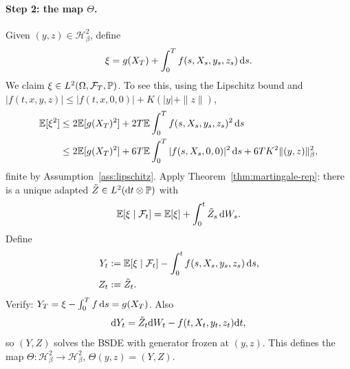 \paragraph{Step 2: the map $\Theta$.}  Given $(y, z) \in \mathcal{H}^2_\beta$, define
\begin{equation}
  \xi = g(X_T) + \int_0^T f(s, X_s, y_s, z_s) \, \mathrm{d} s.
\end{equation}
We claim $\xi \in L^2(\Omega, \mathcal{F}_T, \mathbb{P})$. To see this, using the Lipschitz bound and $|f(t, x, y, z)| \leq |f(t, x, 0, 0)| + K(|y| + \|z\|)$,
\begin{align*}
  \mathbb{E}[\xi^2] &\leq 2 \mathbb{E}[g(X_T)^2] + 2 T \mathbb{E}\int_0^T f(s, X_s, y_s, z_s)^2 \, \mathrm{d} s \\
  &\leq 2 \mathbb{E}[g(X_T)^2] + 6 T \mathbb{E}\int_0^T |f(s, X_s, 0, 0)|^2 \, \mathrm{d} s + 6 T K^2 \|(y, z)\|_\beta^2,
\end{align*}
finite by Assumption~\ref{ass:lipschitz}. Apply Theorem~\ref{thm:martingale-rep}: there is a unique adapted $\tilde Z \in L^2(\mathrm{d} t \otimes \mathbb{P})$ with
\begin{equation}
  \mathbb{E}[\xi \mid \mathcal{F}_t] = \mathbb{E}[\xi] + \int_0^t \tilde Z_s \, \mathrm{d} W_s.
\end{equation}
Define
\begin{align}
  Y_t &:= \mathbb{E}[\xi \mid \mathcal{F}_t] - \int_0^t f(s, X_s, y_s, z_s) \, \mathrm{d} s, \\
  Z_t &:= \tilde Z_t.
\end{align}
Verify: $Y_T = \xi - \int_0^T f \, \mathrm{d} s = g(X_T)$. Also
\begin{equation}
  \mathrm{d} Y_t = \tilde Z_t \mathrm{d} W_t - f(t, X_t, y_t, z_t) \mathrm{d} t,
\end{equation}
so $(Y, Z)$ solves the BSDE with generator frozen at $(y, z)$. This defines the map $\Theta : \mathcal{H}^2_\beta \to \mathcal{H}^2_\beta$, $\Theta(y, z) = (Y, Z)$.

